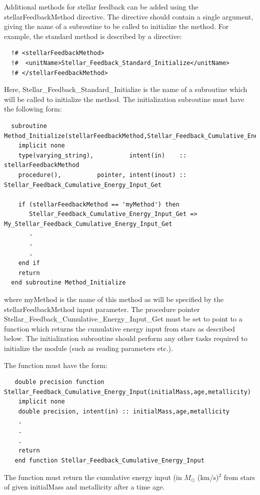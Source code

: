 Additional methods for stellar feedback can be added using the {\normalfont \ttfamily stellarFeedbackMethod} directive. The directive should contain a single argument, giving the name of a subroutine to be called to initialize the method. For example, the {\normalfont \ttfamily standard} method is described by a directive:
\begin{verbatim}
  !# <stellarFeedbackMethod>
  !#  <unitName>Stellar_Feedback_Standard_Initialize</unitName>
  !# </stellarFeedbackMethod>
\end{verbatim}
Here, {\normalfont \ttfamily Stellar\_Feedback\_Standard\_Initialize} is the name of a subroutine which will be called to initialize the method. The initialization subroutine must have the following form:
\begin{verbatim}
  subroutine Method_Initialize(stellarFeedbackMethod,Stellar_Feedback_Cumulative_Energy_Input_Get)
    implicit none
    type(varying_string),          intent(in)    :: stellarFeedbackMethod
    procedure(),          pointer, intent(inout) :: Stellar_Feedback_Cumulative_Energy_Input_Get
    
    if (stellarFeedbackMethod == 'myMethod') then
       Stellar_Feedback_Cumulative_Energy_Input_Get => My_Stellar_Feedback_Cumulative_Energy_Input_Get
       .
       .
       .
    end if
    return
  end subroutine Method_Initialize
\end{verbatim}
where {\normalfont \ttfamily myMethod} is the name of this method as will be specified by the {\normalfont \ttfamily stellarFeedbackMethod} input parameter. The procedure pointer {\normalfont \ttfamily Stellar\_Feedback\_Cumulative\_Energy\_Input\_Get} must be set to point to a function which returns the cumulative energy input from stars as described below. The initialization subroutine should perform any other tasks required to initialize the module (such as reading parameters etc.).

The function must have the form:
\begin{verbatim}
   double precision function Stellar_Feedback_Cumulative_Energy_Input(initialMass,age,metallicity)
    implicit none
    double precision, intent(in) :: initialMass,age,metallicity
    .
    .
    .
    return
   end function Stellar_Feedback_Cumulative_Energy_Input 
\end{verbatim}
The function must return the cumulative energy input (in $M_\odot$ (km/s)$^2$ from stars of given {\normalfont \ttfamily initialMass} and {\normalfont \ttfamily metallicity} after a time {\normalfont \ttfamily age}.

